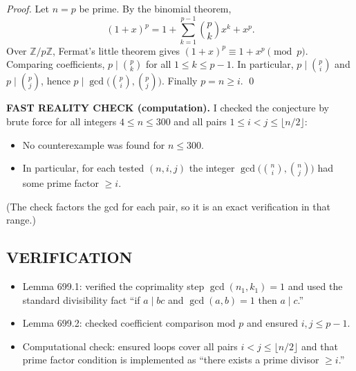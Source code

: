 \emph{Proof.}
Let $n=p$ be prime. By the binomial theorem,
\[(1+x)^p = 1 + \sum_{k=1}^{p-1}\binom{p}{k}x^k + x^p.
\]
Over $\mathbb{Z}/p\mathbb{Z}$, Fermat's little theorem gives $(1+x)^p\equiv 1+x^p\pmod p$. Comparing coefficients, $p\mid \binom{p}{k}$ for all $1\le k\le p-1$. In particular, $p\mid \binom{p}{i}$ and $p\mid \binom{p}{j}$, hence $p\mid \gcd\bigl(\binom{p}{i},\binom{p}{j}\bigr)$. Finally $p=n\ge i$. \qed

\medskip
\textbf{FAST REALITY CHECK (computation).}
I checked the conjecture by brute force for all integers $4\le n\le 300$ and all pairs $1\le i<j\le \lfloor n/2\rfloor$:
\begin{itemize}
\item No counterexample was found for $n\le 300$.
\item In particular, for each tested $(n,i,j)$ the integer $\gcd\bigl(\binom{n}{i},\binom{n}{j}\bigr)$ had some prime factor $\ge i$.
\end{itemize}
(The check factors the gcd for each pair, so it is an exact verification in that range.)

\subsection*{VERIFICATION}
\begin{itemize}
\item Lemma 699.1: verified the coprimality step $\gcd(n_1,k_1)=1$ and used the standard divisibility fact ``if $a\mid bc$ and $\gcd(a,b)=1$ then $a\mid c$.''
\item Lemma 699.2: checked coefficient comparison mod $p$ and ensured $i,j\le p-1$.
\item Computational check: ensured loops cover all pairs $i<j\le\lfloor n/2\rfloor$ and that prime factor condition is implemented as ``there exists a prime divisor $\ge i$.''
\end{itemize}

